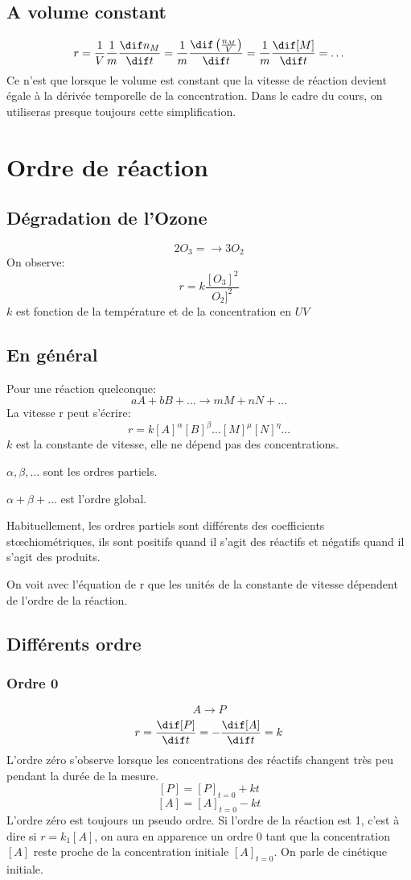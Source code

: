 \subsection{A volume constant}
\[ r = \frac 1V \frac 1m \frac {\dif n_M}{\dif t} =
  \frac 1m \frac {\dif \left(\frac {n_M}V\right)}{\dif t} =
  \frac 1m \frac {\dif [M]}{\dif t} = \ldots \]
Ce n'est que lorsque le volume est constant que la vitesse de
réaction devient égale à la dérivée temporelle de la concentration.
Dans le cadre du cours, on utiliseras presque toujours cette simplification.
\section{Ordre de réaction}
\subsection{Dégradation de l'Ozone}
\[ 2O_3 = \longrightarrow 3O_2 \]
On observe:
\[  r = k \frac{[O_3]^2}{O_2]^2} \]
$k$ est fonction de la température et de la concentration en $UV$

\subsection{En général}
Pour une réaction quelconque:
\[ aA+bB+\ldots \longrightarrow mM + nN + \ldots \]
La vitesse r peut s'écrire:
\[  r = k[A]^{\alpha}[B]^{\beta}\ldots[M]^{\mu}[N]^{\eta}\ldots \]
$k$ est la constante de vitesse, elle ne dépend pas des concentrations.

$\alpha,\beta,\ldots$ sont les ordres partiels.

$\alpha+\beta+\ldots$ est l'ordre global.

Habituellement, les ordres partiels sont différents
des coefficients stœchiométriques,
ils sont positifs quand il s'agit des réactifs et
négatifs quand il s'agit des produits.

On voit avec l'équation de r que les unités de
la constante de vitesse dépendent de l'ordre de la réaction.

\subsection{Différents ordre}
\subsubsection{Ordre 0}
\[ A\longrightarrow P \]
\[ r = \frac{\dif [P]}{\dif t} = -\frac{\dif [A]}{\dif t} = k \]
L'ordre zéro s'observe lorsque les concentrations des réactifs
changent très peu pendant la durée de la mesure.
\[ [P] = [P]_{t = 0}+kt \]
\[ [A] = [A]_{t = 0}-kt \]
L'ordre zéro est toujours un pseudo ordre.
Si l'ordre de la réaction est 1, c'est à dire si $r = k_1[A]$,
on aura en apparence un ordre 0 tant que la concentration $[A]$
reste proche de la concentration initiale $[A]_{t = 0}$.
On parle de cinétique initiale.

